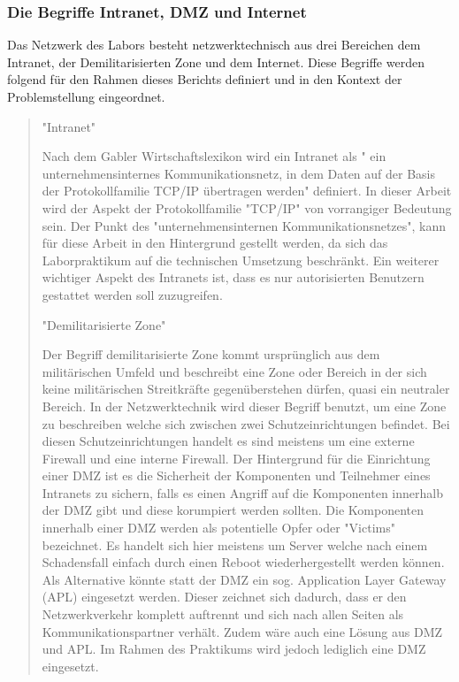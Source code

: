 \documentclass[
a4paper,     %
 headsepline, %
footsepline, %
titlepage,   %
 halfparskip,     %
 fleqn,       %
12pt         %
]{scrartcl}  %
\begin{document}
\subsubsection{Die Begriffe Intranet, DMZ und Internet}
Das Netzwerk des Labors besteht netzwerktechnisch aus drei Bereichen dem Intranet, der Demilitarisierten Zone und dem Internet. 
Diese Begriffe werden folgend für den Rahmen dieses Berichts definiert und in den Kontext der Problemstellung eingeordnet.
\begin{quotation}
\item["Intranet"]

Nach dem Gabler Wirtschaftslexikon wird ein Intranet als " ein unternehmensinternes Kommunikationsnetz, in dem Daten auf der Basis der Protokollfamilie TCP/IP übertragen werden" definiert. In dieser Arbeit wird der Aspekt der Protokollfamilie "TCP/IP" von vorrangiger Bedeutung sein. Der Punkt des "unternehmensinternen Kommunikationsnetzes", kann für diese Arbeit in den Hintergrund gestellt werden, da sich das Laborpraktikum auf die technischen Umsetzung beschränkt. 
Ein weiterer wichtiger Aspekt des Intranets ist, dass es nur autorisierten Benutzern gestattet werden soll zuzugreifen.  

\item["Demilitarisierte Zone"]

Der Begriff demilitarisierte Zone kommt ursprünglich aus dem militärischen Umfeld und beschreibt eine Zone oder Bereich in der sich keine militärischen Streitkräfte gegenüberstehen dürfen, quasi ein neutraler Bereich. 
In der Netzwerktechnik wird dieser Begriff benutzt, um eine Zone zu beschreiben welche sich zwischen zwei Schutzeinrichtungen befindet. Bei diesen Schutzeinrichtungen handelt es sind meistens um eine externe Firewall und eine interne Firewall. Der Hintergrund für die Einrichtung einer DMZ ist es die Sicherheit der Komponenten und Teilnehmer eines Intranets zu sichern, falls es einen Angriff auf die Komponenten innerhalb der DMZ gibt und diese korumpiert werden sollten. Die Komponenten innerhalb einer DMZ werden als potentielle Opfer oder "Victims" bezeichnet. Es handelt sich hier meistens um Server welche nach einem Schadensfall einfach durch einen Reboot wiederhergestellt werden können. 
Als Alternative könnte statt der DMZ ein sog. Application Layer Gateway (APL) eingesetzt werden. Dieser zeichnet sich dadurch, dass er den Netzwerkverkehr komplett auftrennt und sich nach allen Seiten als Kommunikationspartner verhält. Zudem wäre auch eine Lösung aus DMZ und APL\cite{intra1}. Im Rahmen des Praktikums wird jedoch lediglich eine DMZ eingesetzt.


\end{quotation}
\end{document}
